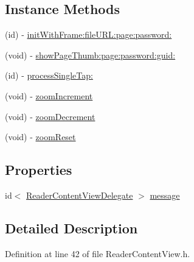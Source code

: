 \subsection*{Instance Methods}
\begin{DoxyCompactItemize}
\item 
(id) -\/ \hyperlink{interface_reader_content_view_ac045875376b7c51f37c2ee946f9c3de4}{init\-With\-Frame\-:file\-U\-R\-L\-:page\-:password\-:}
\item 
(void) -\/ \hyperlink{interface_reader_content_view_a952138f340db971d89ca8f455c20eda8}{show\-Page\-Thumb\-:page\-:password\-:guid\-:}
\item 
(id) -\/ \hyperlink{interface_reader_content_view_ace7f8325b0e739649fe9aab17a15b66a}{process\-Single\-Tap\-:}
\item 
(void) -\/ \hyperlink{interface_reader_content_view_af43ce1f20e44310bfc790100ed823d37}{zoom\-Increment}
\item 
(void) -\/ \hyperlink{interface_reader_content_view_a9045f28f0f226225b3da62941522252d}{zoom\-Decrement}
\item 
(void) -\/ \hyperlink{interface_reader_content_view_a771f0b83553366bd863f9c5b00db4808}{zoom\-Reset}
\end{DoxyCompactItemize}
\subsection*{Properties}
\begin{DoxyCompactItemize}
\item 
id$<$ \hyperlink{protocol_reader_content_view_delegate-p}{Reader\-Content\-View\-Delegate} $>$ \hyperlink{interface_reader_content_view_abbbb9c4881d98915cb299e3f903b9719}{message}
\end{DoxyCompactItemize}


\subsection{Detailed Description}


Definition at line 42 of file Reader\-Content\-View.\-h.



